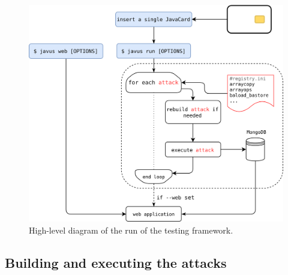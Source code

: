 \documentclass{../llncs/llncs}
\begin{document}
    \begin{figure}[htb]
        \centering
        \includegraphics[width=.9\textwidth]{src/diagrams/full-design-new.png}
    \caption{High-level diagram of the run of the testing framework.} %
        \label{fig:full-design-diagram}
    \end{figure}

        



    \subsection{Building and executing the attacks}\label{sec:build-execute-attacks}
\end{document}
